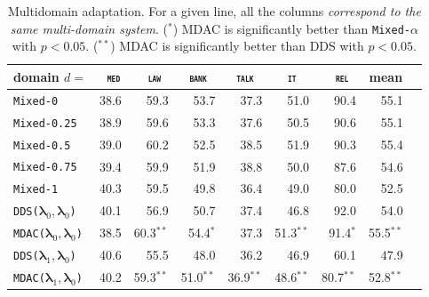 \documentclass[11pt]{article}
\newcommand{\domain}[1]{\texttt{\textsc{#1}}}
\newcommand{\system}[1]{\texttt{{#1}}}
\newcommand{\vlambda}{\ensuremath{\boldsymbol\lambda}\xspace} %
\begin{document}
\begin{table}[htbp]
  \vspace{-2\baselineskip}
  \centering \small
  \begin{tabular}{|l|*8{r|}} \hline
    domain \hfill $d=$ & \multicolumn{1}{c|}{\domain{ med}} & \multicolumn{1}{c|}{\domain{ law}} & \multicolumn{1}{c|}{\domain{bank}} & \multicolumn{1}{c|}{\domain{talk}} & \multicolumn{1}{c|}{\domain{ it }} & \multicolumn{1}{c|}{\domain{ rel}} & \multicolumn{1}{c|}{mean} \\ \hline \hline
    \system{Mixed-0} &38.6&59.3&53.7&37.3&51.0&90.4&55.1\\
    \system{Mixed-0.25}&38.9&59.6&53.3&37.6&50.5&90.6&55.1\\
    \system{Mixed-0.5}&39.0&60.2&52.5&38.5&51.9&90.3&55.4\\
    \system{Mixed-0.75}&39.4&59.9&51.9&38.8&50.0&87.6&54.6\\
    \system{Mixed-1}&40.3&59.5&49.8&36.4&49.0&80.0&52.5\\
    \hline \hline
    \system{DDS($\vlambda_0, \vlambda_0$)} &40.1&56.9&50.7&37.4&46.8&92.0&54.0\\ 
    \system{MDAC($\vlambda_0, \vlambda_0$)}&38.5&60.3$^{**}$&54.4$^*$&37.3&51.3$^{**}$&91.4$^*$&55.5$^{**}$\\ 
    \hline \hline
    \system{DDS($\vlambda_1, \vlambda_0$)} &40.6&55.5&48.0&36.2&46.9&60.1&47.9\\
    \system{MDAC($\vlambda_1, \vlambda_0$)}&40.2&59.3$^{**}$&51.0$^{**}$&36.9$^{**}$&48.6$^{**}$&80.7$^{**}$&52.8$^{**}$\\
    \hline
  \end{tabular}
  \caption{Multidomain adaptation. For a given line, all the columns \emph{correspond to the same multi-domain system}. ($^*$) MDAC is significantly better than \system{Mixed-$\alpha$} with $p<0.05$. ($^{**}$) MDAC is significantly better than DDS with $p<0.05$.}
  \label{tab:multi-da}
\end{table}
\end{document}
